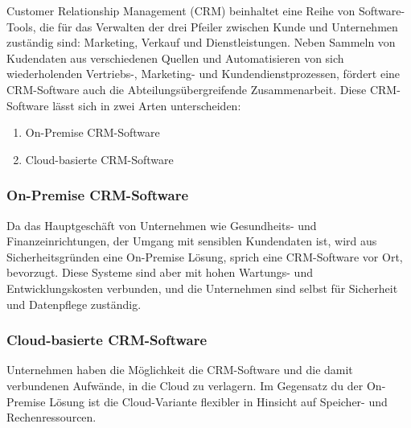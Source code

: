 Customer Relationship Management (CRM) beinhaltet eine Reihe von Software-Tools, die für das Verwalten der drei Pfeiler zwischen Kunde und Unternehmen zuständig sind: Marketing, Verkauf und Dienstleistungen. Neben Sammeln von Kudendaten aus verschiedenen Quellen und Automatisieren von sich wiederholenden Vertriebs-, Marketing- und Kundendienstprozessen, fördert eine CRM-Software auch die Abteilungsübergreifende Zusammenarbeit. Diese CRM-Software lässt sich in zwei Arten unterscheiden:
\begin{enumerate}
    \item On-Premise CRM-Software
    \item Cloud-basierte CRM-Software
\end{enumerate}

\subsubsection{On-Premise CRM-Software}
Da das Hauptgeschäft von Unternehmen wie Gesundheits- und Finanzeinrichtungen, der Umgang mit sensiblen Kundendaten ist, wird aus Sicherheitsgründen eine On-Premise Lösung, sprich eine CRM-Software vor Ort, bevorzugt. Diese Systeme sind aber mit hohen Wartungs- und Entwicklungskosten verbunden, und die Unternehmen sind selbst für Sicherheit und Datenpflege zuständig.  

\subsubsection{Cloud-basierte CRM-Software}
Unternehmen haben die Möglichkeit die CRM-Software und die damit verbundenen Aufwände, in die Cloud zu verlagern. Im Gegensatz du der On-Premise Lösung ist die Cloud-Variante flexibler in Hinsicht auf Speicher- und Rechenressourcen.